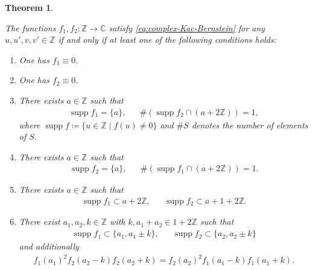 \documentclass[12pt]{article}
\newtheorem{theorem}{Theorem}[section]
\theoremstyle{definition}
\theoremstyle{remark}
\numberwithin{equation}{section}
\numberwithin{figure}{section}
\numberwithin{table}{section}
\DeclareMathOperator{\supp}{supp}
\begin{document}
\begin{theorem}
    \label{thm:Z-characterize}

The functions $ f_1 , f_2 \colon \mathbb{ Z } \to \mathbb{ C } $ satisfy \eqref{eq:complex-Kac-Bernstein} for any $ u , u' , v , v' \in \mathbb{ Z } $ if and only if at least one of the following conditions holds:

\begin{enumerate}
  \item \label{item:Z-characterize-f1-zero}
  
  One has $ f_1 \equiv 0 $.

  \item \label{item:Z-characterize-f2-zero}
  
  One has $ f_2 \equiv 0 $.

\item \label{item:Z-characterize-f1-one-point}

There exists $ a \in \mathbb{ Z } $ such that
\begin{align}
    \supp f_1 = \{ a \} , & & 
    \# ( \supp f_2 \cap ( a + 2 \mathbb{ Z } ) ) = 1,
\end{align}
where $ \supp f \coloneqq \{ u \in \mathbb{ Z } \mid f ( u ) \neq 0 \} $ and $ \# S $ denotes the number of elements of $ S $.

\item \label{item:Z-characterize-f2-one-point}

There exists $ a \in \mathbb{ Z } $ such that
\begin{align}
    \supp f_2 = \{ a \} , & &
    \# ( \supp f_1 \cap ( a + 2 \mathbb{ Z } ) ) = 1.
\end{align}

\item \label{item:Z-characterize-independent}

There exists $ a \in \mathbb{ Z } $ such that
\begin{align}
  \supp f_1 \subset a + 2 \mathbb{ Z }, & &
  \supp f_2 \subset a + 1 + 2 \mathbb{ Z }.
\end{align}

\item \label{item:Z-characterize-six-point}

There exist $ a_1 , a_2 , k \in \mathbb{ Z } $ with $ k , a_1 + a_2 \in 1 + 2 \mathbb{ Z } $ such that
\begin{align}
    \supp f_1 \subset \{ a_1 , a_1 \pm k \}, &  &
\supp f_2 \subset \{ a_2 , a_2 \pm k \} \label{eq:Z-characterize-six-point-support}
\end{align}
and additionally
\begin{align}
    f_1 ( a_1 )^2 f_2 ( a_2 - k ) f_2 ( a_2 + k ) = f_2 ( a_2 )^2 f_1 ( a_1 - k ) f_1 ( a_1 + k ). \label{eq:Z-characterize-six-point-equation}
\end{align}


\end{enumerate}
\end{theorem}
\end{document}
